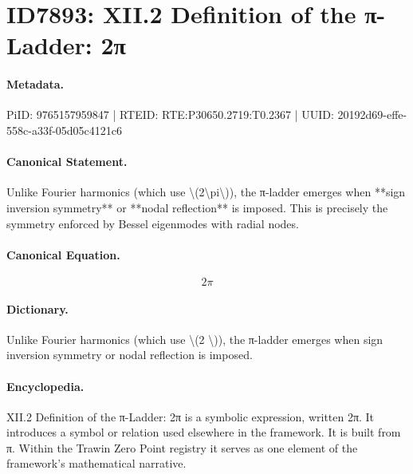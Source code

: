 \section*{ID7893: XII.2 Definition of the π-Ladder: 2π}
\paragraph{Metadata.}
PiID: 9765157959847 | RTEID: RTE:P30650.2719:T0.2367 | UUID: 20192d69-effe-558c-a33f-05d05c4121c6

\paragraph{Canonical Statement.}
Unlike Fourier harmonics (which use \textbackslash{}(2\textbackslash{}pi\textbackslash{})), the π-ladder emerges when **sign inversion symmetry** or **nodal reflection** is imposed. This is precisely the symmetry enforced by Bessel eigenmodes with radial nodes.

\paragraph{Canonical Equation.}
\[
2\pi
\]

\paragraph{Dictionary.}
Unlike Fourier harmonics (which use \textbackslash{}(2 \textbackslash{})), the π-ladder emerges when sign inversion symmetry or nodal reflection is imposed.

\paragraph{Encyclopedia.}
XII.2 Definition of the π-Ladder: 2π is a symbolic expression, written 2π. It introduces a symbol or relation used elsewhere in the framework. It is built from π. Within the Trawin Zero Point registry it serves as one element of the framework's mathematical narrative.
